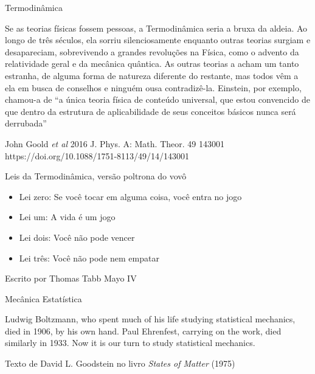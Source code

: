 \begin{frame}[c]{Termodinâmica}
    \begin{minipage}{\textwidth}
        \color{blue}
        Se as teorias físicas fossem pessoas, a Termodinâmica seria a bruxa da
        aldeia. Ao longo de três séculos, ela sorriu silenciosamente enquanto
        outras teorias surgiam e desapareciam, sobrevivendo a grandes
        revoluções na Física, como o advento da relatividade geral e da
        mecânica quântica. As outras teorias a acham um tanto estranha, de
        alguma forma de natureza diferente do restante, mas todos vêm a ela em
        busca de conselhos e ninguém ousa contradizê-la. Einstein, por exemplo,
        chamou-a de “a única teoria física de conteúdo universal, que estou
        convencido de que dentro da estrutura de aplicabilidade de seus
        conceitos básicos nunca será derrubada”
    \end{minipage}

    \vspace{1cm}
    John Goold \textit{et al} 2016 J. Phys. A: Math. Theor. 49 143001 \\
    https://doi.org/10.1088/1751-8113/49/14/143001
\end{frame}

\begin{frame}[c]{Leis da Termodinâmica, versão poltrona do vovô}
    \begin{itemize}
        \item Lei zero: Se você tocar em alguma coisa, você entra no jogo
        \item Lei um: A vida é um jogo
        \item Lei dois: Você não pode vencer
        \item Lei três: Você não pode nem empatar
    \end{itemize}

    \vspace{1cm}
    Escrito por Thomas Tabb Mayo IV
\end{frame}

\begin{frame}[c]{Mecânica Estatística}
    \begin{minipage}{\textwidth}
        \color{blue}
        Ludwig Boltzmann, who spent much of his life studying statistical
        mechanics, died in 1906, by his own hand. Paul Ehrenfest, carrying on the
        work, died similarly in 1933. Now it is our turn to study statistical
        mechanics.
    \end{minipage}

    \vspace{1cm}
    Texto de David L. Goodstein no livro \textit{States of Matter} (1975)
\end{frame}

